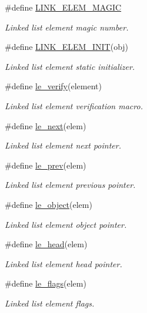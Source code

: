 \begin{CompactItemize}
\#define \hyperlink{group__dbprim__link_ga20}{LINK\_\-ELEM\_\-MAGIC}
\begin{CompactList}\small\item\em Linked list element magic number. \item\end{CompactList}\item 
\#define \hyperlink{group__dbprim__link_ga21}{LINK\_\-ELEM\_\-INIT}(obj)
\begin{CompactList}\small\item\em Linked list element static initializer. \item\end{CompactList}\item 
\#define \hyperlink{group__dbprim__link_ga22}{le\_\-verify}(element)
\begin{CompactList}\small\item\em Linked list element verification macro. \item\end{CompactList}\item 
\#define \hyperlink{group__dbprim__link_ga23}{le\_\-next}(elem)
\begin{CompactList}\small\item\em Linked list element next pointer. \item\end{CompactList}\item 
\#define \hyperlink{group__dbprim__link_ga24}{le\_\-prev}(elem)
\begin{CompactList}\small\item\em Linked list element previous pointer. \item\end{CompactList}\item 
\#define \hyperlink{group__dbprim__link_ga25}{le\_\-object}(elem)
\begin{CompactList}\small\item\em Linked list element object pointer. \item\end{CompactList}\item 
\#define \hyperlink{group__dbprim__link_ga26}{le\_\-head}(elem)
\begin{CompactList}\small\item\em Linked list element head pointer. \item\end{CompactList}\item 
\#define \hyperlink{group__dbprim__link_ga27}{le\_\-flags}(elem)
\begin{CompactList}\small\item\em Linked list element flags. \item\end{CompactList}\end{CompactItemize}
